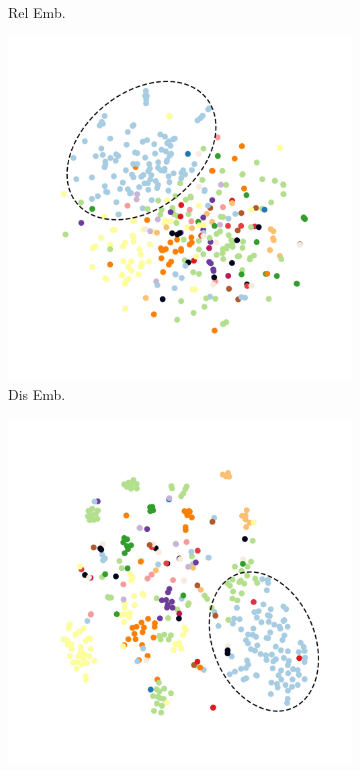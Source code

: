 \documentclass[letterpaper]{article} %
\begin{document}
\begin{figure}[t]
\begin{subfigure}{.24\textwidth}
			\caption{Rel Emb.}
			\label{fig:subfig:b}
		\end{subfigure}
		\begin{subfigure}{.24\textwidth}
			\centering
			\includegraphics[width=\textwidth]{Yang_Liu_dis_new.pdf}
			\caption{Dis Emb.}
			\label{fig:subfig:c}
		\end{subfigure}
		\begin{subfigure}{.24\textwidth}
			\centering
			\includegraphics[width=\textwidth]{Yang_Liu_gen_new.pdf}

\end{subfigure}
\end{figure}
\end{document}
